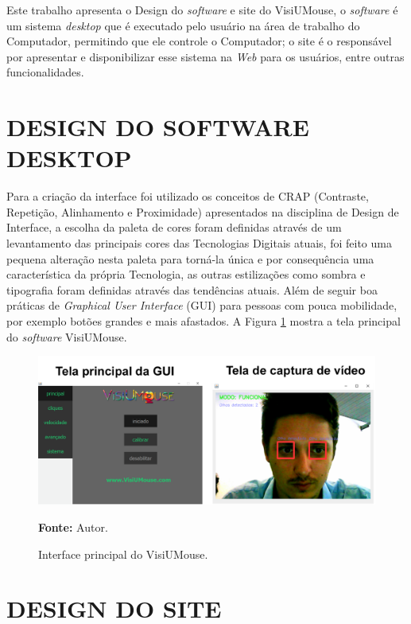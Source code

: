 Este trabalho apresenta o Design do \textit{software} e site do VisiUMouse, o \textit{software} é um sistema \textit{desktop} que é executado pelo usuário na área de trabalho do Computador, permitindo que ele controle o Computador; o site é o responsável por apresentar e disponibilizar esse sistema na \textit{Web} para os usuários, entre outras funcionalidades.

\section{DESIGN DO SOFTWARE DESKTOP}\label{Sub:software}
Para a criação da interface foi utilizado os conceitos de CRAP (Contraste, Repetição, Alinhamento e Proximidade) apresentados na disciplina de Design de Interface, a escolha da paleta de cores foram definidas através de um levantamento das principais cores das Tecnologias Digitais atuais, foi feito uma pequena alteração nesta paleta para torná-la única e por consequência uma característica da própria Tecnologia, as outras estilizações como sombra e tipografia foram definidas através das tendências atuais. Além de seguir boa práticas de \textit{Graphical User Interface} (GUI) para pessoas com pouca mobilidade, por exemplo botões grandes e mais afastados. A Figura \ref{fig:interface-tecnologia} mostra a tela principal do \textit{software} VisiUMouse.

\begin{figure}[htbp]
\caption{Interface principal do VisiUMouse.} 
\centering \includegraphics[scale=.3]{img/interface-tecnologia.png}

\textbf{Fonte:} Autor.
\label{fig:interface-tecnologia}
\end{figure}

\section{DESIGN DO SITE}\label{Sub:site}


